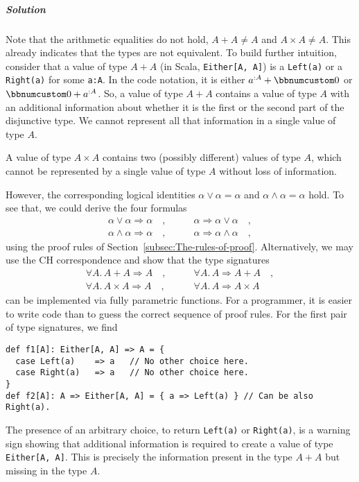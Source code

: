 \subparagraph{Solution}

Note that the arithmetic equalities do not hold, $A+A\neq A$ and
$A\times A\ne A$. This already indicates that the types are not equivalent.
To build further intuition, consider that a value of type $A+A$ (in
Scala, \lstinline!Either[A, A]!) is a \lstinline!Left(a)! or a \lstinline!Right(a)!
for some \lstinline!a:A!. In the code notation, it is either $a^{:A}+\bbnum 0$
or $\bbnum 0+a^{:A}$. So, a value of type $A+A$ contains a value
of type $A$ with an additional information about whether it is the
first or the second part of the disjunctive type. We cannot represent
all that information in a single value of type $A$. 

A value of type $A\times A$ contains two (possibly different) values
of type $A$, which cannot be represented by a single value of type
$A$ without loss of information.

However, the corresponding logical identities $\alpha\vee\alpha=\alpha$
and $\alpha\wedge\alpha=\alpha$ hold. To see that, we could derive
the four formulas
\begin{align*}
\alpha\vee\alpha\Rightarrow\alpha\quad, & \quad\quad\alpha\Rightarrow\alpha\vee\alpha\quad,\\
\alpha\wedge\alpha\Rightarrow\alpha\quad, & \quad\quad\alpha\Rightarrow\alpha\wedge\alpha\quad,
\end{align*}
using the proof rules of Section~\ref{subsec:The-rules-of-proof}.
Alternatively, we may use the CH correspondence and show that the
type signatures
\begin{align*}
\forall A.\,A+A\Rightarrow A\quad, & \quad\quad\forall A.\,A\Rightarrow A+A\quad,\\
\forall A.\,A\times A\Rightarrow A\quad, & \quad\quad\forall A.\,A\Rightarrow A\times A\quad
\end{align*}
can be implemented via fully parametric functions. For a programmer,
it is easier to write code than to guess the correct sequence of proof
rules. For the first pair of type signatures, we find
\begin{lstlisting}
def f1[A]: Either[A, A] => A = {
  case Left(a)    => a   // No other choice here.
  case Right(a)   => a   // No other choice here.
}
def f2[A]: A => Either[A, A] = { a => Left(a) } // Can be also Right(a).
\end{lstlisting}
The presence of an arbitrary choice, to return \lstinline!Left(a)!
or \lstinline!Right(a)!, is a warning sign showing that additional
information is required to create a value of type \lstinline!Either[A, A]!.
This is precisely the information present in the type $A+A$ but missing
in the type $A$.

